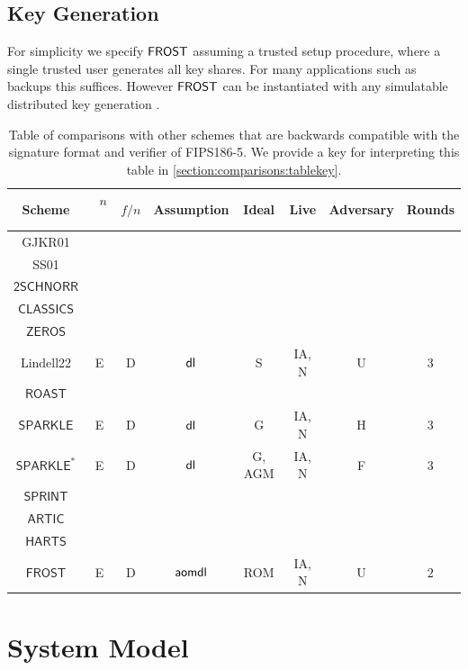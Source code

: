 \subsection{Key Generation}\label{section:comparisons:keygeneration}
For simplicity we specify $\mathsf{FROST}$ assuming a trusted setup procedure, where a single trusted user generates all key shares.
For many applications such as backups this suffices.
However  $\mathsf{FROST}$ can be instantiated with any simulatable distributed key generation \cite{}.

\begin{table}[htbp]
	\centering
	\begin{tabular}{c c c c c c c c}
		\toprule
		Scheme & \ $n$ \ & $f/n$ & Assumption & Ideal & Live & Adversary & Rounds \\ \midrule
		GJKR01 \cite{GennaroJKR01}& & & & & & & \\ 
		SS01 \cite{StinsonS01} & & & & &  & & \\
		$\mathsf{2SCHNORR}$ & & & & & &  & \\
		$\mathsf{CLASSICS}$ & & & & & & & \\
		$\mathsf{ZEROS}$ & & & & & &   & \\
		Lindell22 \cite{Lindell22} & E & D & $\mathsf{dl}$ & S &  IA, N & U & $3$ \\
		$\mathsf{ROAST}$ & & & & &  & & \\
		$\mathsf{SPARKLE}$ & E & D & $\mathsf{dl}$ & G & IA, N & H & $3$ \\
		$\mathsf{SPARKLE}^*$ & E & D & $\mathsf{dl}$ & G, AGM & IA, N & F & $3$ \\
		$\mathsf{SPRINT}$ & & & & & &  & \\
		$\mathsf{ARTIC}$ & & & & & &  & \\
		$\mathsf{HARTS}$ & & & & & &  & \\
		\midrule 
		$\mathsf{FROST}$ & E & D & $\mathsf{aomdl}$ & ROM & IA, N & U & $2$ \\
		\bottomrule
	\end{tabular}
	\caption{\label{table:comparisons}
		Table of comparisons with other schemes that are backwards compatible with the signature format and verifier of FIPS186-5.
		We provide a key for interpreting this table in \cref{section:comparisons:tablekey}.
	 }
\end{table}


\section{System Model}\label{section:system-model}

